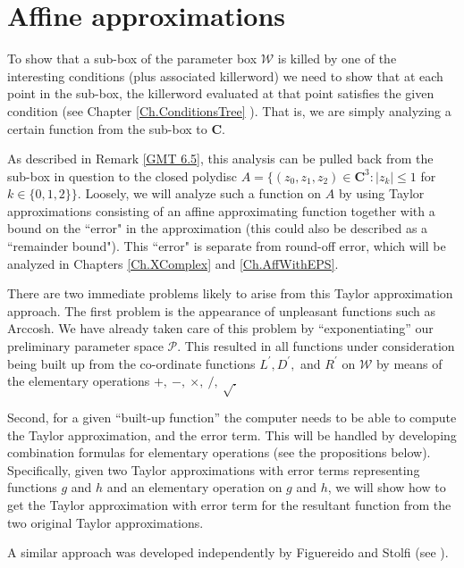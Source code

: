\chapter{Affine approximations}\label{Ch.AffApprox} %

 
\begin{remark} \label{GMT 6.1}
To show that a sub-box of the parameter box ${\mathcal W}$ is killed by one of the interesting conditions (plus associated killerword) we need to show that at each point in the sub-box, the killerword evaluated at that point satisfies the given condition (see
	Chapter \ref{Ch.ConditionsTree}
	).  That is, we are simply analyzing a certain function from the sub-box to ${\mathbf C}$.  

As described in Remark \ref{GMT 6.5}, this analysis can be pulled back from the sub-box in question to the closed polydisc 
$A = \{(z_0,z_1,z_2) \in {\mathbf C}^3 : |z_k| \le 1$  for $k \in \{0,1,2\}\}.$  
Loosely,  we will analyze such a function on $A$ by using  Taylor approximations consisting of an affine approximating
function together with a bound on the ``error" in the approximation (this could also be described as a ``remainder bound").  This ``error" 
is separate from round-off error,  which will be analyzed in Chapters \ref{Ch.XComplex} and \ref{Ch.AffWithEPS}.  \end{remark}

\begin{problem} There are two immediate problems likely to arise from this Taylor approximation approach.
The first problem is the appearance of unpleasant functions such as 
Arccosh.  We have already taken care of this problem by ``exponentiating'' our preliminary parameter space ${\mathcal P}$.  This resulted in all functions under consideration being built up from the co-ordinate functions $ L^{\prime}, D^{\prime},$ and $ R^{\prime}$ on ${\mathcal W}$ by means of the elementary operations $+,\ -,\ \times,\ /,\ \sqrt.$ 

Second,  for a given ``built-up function'' the computer needs to be able to compute the Taylor approximation, and the error term.  This will be handled 
by developing combination formulas for elementary operations (see the propositions below).  Specifically, given two Taylor
approximations with error terms representing functions $g$ and $h$ and an elementary operation on $g$ and $h$, we will show how to
get the Taylor approximation with error term for the resultant function from the two original Taylor approximations. 

A similar approach was developed independently by Figuereido and Stolfi  (see \cite{FS}).\end{problem}

